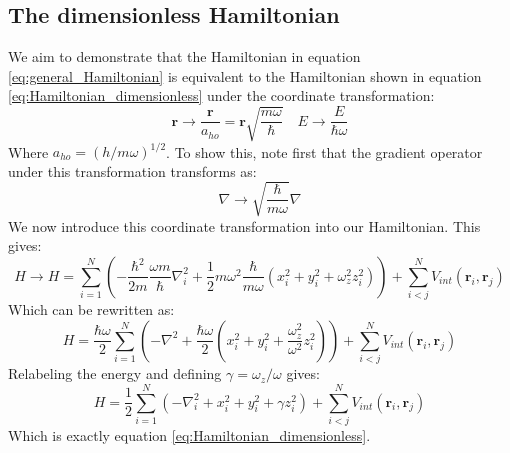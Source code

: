 \documentclass[a4paper, 10pt]{article}
\begin{document}
\begin{appendices}
		\section{The dimensionless Hamiltonian}\label{ap:dimensionless_hamiltonian}
		We aim to demonstrate that the Hamiltonian in equation \ref{eq:general_Hamiltonian} is equivalent to the Hamiltonian shown in equation \ref{eq:Hamiltonian_dimensionless} under the coordinate transformation:
		\begin{equation}
		\boldsymbol{r}\rightarrow \frac{\boldsymbol{r}}{a_{ho}}=\boldsymbol{r} \sqrt{\frac{m\omega}{\hbar}} \quad E\rightarrow \frac{E}{\hbar \omega}
		\end{equation}
		Where $a_{ho}=(h/m\omega)^{1/2}$. To show this, note first that the gradient operator under this transformation transforms as:
		\begin{equation}
		\nabla \rightarrow \sqrt{\frac{\hbar}{m\omega}} \nabla
		\end{equation}
		We now introduce this coordinate transformation into our Hamiltonian. This gives:
		\begin{equation}
		H\rightarrow H=\sum_{i=1}^{N}\left(-\frac{\hbar^2}{2m}\frac{\omega m}{\hbar}\nabla_i^2+\frac{1}{2}m\omega^2 \frac{\hbar}{m\omega}(x_i^2+y_i^2 +\omega_z^2 z_i^2) \right)+\sum_{i<j}^N V_{int}(\boldsymbol{r}_i, \boldsymbol{r}_j)
		\end{equation}
		Which can be rewritten as:
		\begin{equation}
		H=\frac{\hbar \omega}{2}\sum_{i=1}^N\left(-\nabla^2 +\frac{\hbar \omega}{2}\left(x_i^2+y_i^2 + \frac{\omega_z^2}{\omega^2}z_i^2\right)\right)+\sum_{i<j}^N V_{int}(\boldsymbol{r}_i, \boldsymbol{r}_j)
		\end{equation}
		Relabeling the energy and defining $\gamma=\omega_z/\omega$ gives:
		\begin{equation}
		H=\frac{1}{2}\sum_{i=1}^N \left(-\nabla_i^2 +x_i^2+y_i^2+\gamma z_i^2\right)+\sum_{i<j}^N V_{int}(\boldsymbol{r}_i, \boldsymbol{r}_j)
		\end{equation}
		Which is exactly equation \ref{eq:Hamiltonian_dimensionless}.

\end{appendices}
\end{document}
